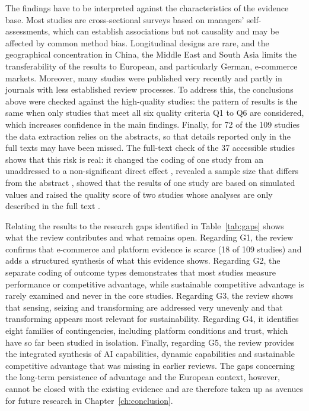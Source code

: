 The findings have to be interpreted against the characteristics of the evidence base. Most studies are cross-sectional surveys based on managers' self-assessments, which can establish associations but not causality and may be affected by common method bias. Longitudinal designs are rare, and the geographical concentration in China, the Middle East and South Asia limits the transferability of the results to European, and particularly German, e-commerce markets. Moreover, many studies were published very recently and partly in journals with less established review processes. To address this, the conclusions above were checked against the high-quality studies: the pattern of results is the same when only studies that meet all six quality criteria Q1 to Q6 are considered, which increases confidence in the main findings. Finally, for 72 of the 109 studies the data extraction relies on the abstracts, so that details reported only in the full texts may have been missed. The full-text check of the 37 accessible studies shows that this risk is real: it changed the coding of one study from an unaddressed to a non-significant direct effect , revealed a sample size that differs from the abstract , showed that the results of one study are based on simulated values  and raised the quality score of two studies whose analyses are only described in the full text .

Relating the results to the research gaps identified in Table~\ref{tab:gaps} shows what the review contributes and what remains open. Regarding G1, the review confirms that e-commerce and platform evidence is scarce (18 of 109 studies) and adds a structured synthesis of what this evidence shows. Regarding G2, the separate coding of outcome types demonstrates that most studies measure performance or competitive advantage, while sustainable competitive advantage is rarely examined and never in the core studies. Regarding G3, the review shows that sensing, seizing and transforming are addressed very unevenly and that transforming appears most relevant for sustainability. Regarding G4, it identifies eight families of contingencies, including platform conditions and trust, which have so far been studied in isolation. Finally, regarding G5, the review provides the integrated synthesis of AI capabilities, dynamic capabilities and sustainable competitive advantage that was missing in earlier reviews. The gaps concerning the long-term persistence of advantage and the European context, however, cannot be closed with the existing evidence and are therefore taken up as avenues for future research in Chapter~\ref{ch:conclusion}.

